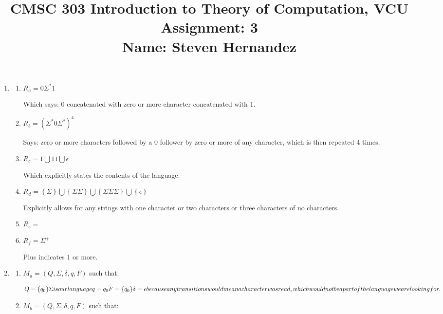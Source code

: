 \documentclass{article}
\newcommand{\set}[1]{{\left\{#1\right\}}}    %
\begin{document}
\title{
    CMSC 303 Introduction to Theory of Computation, VCU\\
    Assignment: 3\\
    Name: Steven Hernandez
}

\date{}

\maketitle
\vspace{-10mm}

\begin{enumerate}
    \item %
        \begin{enumerate}
            \item
                $R_a = 0\Sigma^*1$

                Which says: $0$ concatenated with zero or more character concatenated with 1.
            \item
                $R_b = (\Sigma^*0\Sigma^*)^4$

                Says: zero or more characters followed by a $0$ follower by zero or more of any character, which is then repeated 4 times.
            \item
                $R_c = 1 \bigcup 11 \bigcup \epsilon$

                Which explicitly states the contents of the language.
            \item
                $R_d = \set{\Sigma} \bigcup \set{\Sigma\Sigma} \bigcup \set{\Sigma\Sigma\Sigma} \bigcup \set{\epsilon}$

                Explicitly allows for any strings with one character or two characters or three characters of no characters.
            \item
                $R_e = $ %
            \item
                $R_f = \Sigma^+$

                Plus indicates 1 or more.
        \end{enumerate}
    \item %
        \begin{enumerate}
            \item
                $M_a = (Q, \Sigma, \delta, q, F)$ such that:

                \[  Q = \set{q_0} \\
                    \Sigma is our language \\
                    q = q_0 \\
                    F = \set{q_0} \\
                    \delta = \epsilon because any transitions would mean a character was read, which would not be a part of the language we are looking for.
                \]
            \item
                $M_b = (Q, \Sigma, \delta, q, F)$ such that:


\end{enumerate}
\end{enumerate}
\end{document}
